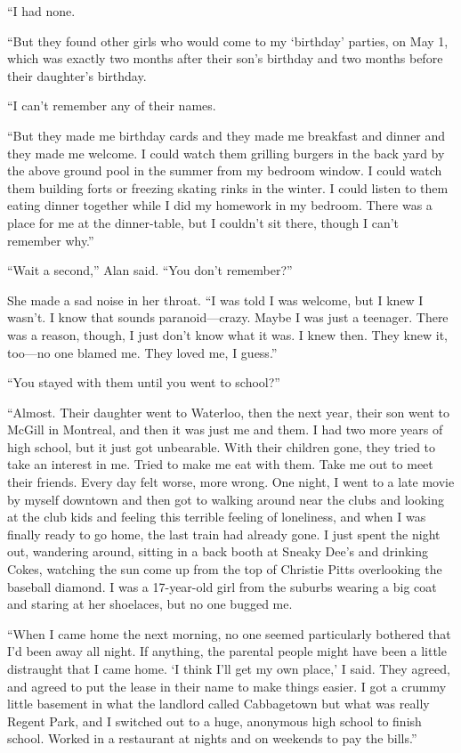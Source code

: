 \documentclass{article}
\begin{document}
``I had none.

``But they found other girls who would come to my `birthday' parties,
on May 1, which was exactly two months after their son's birthday and
two months before their daughter's birthday.

``I can't remember any of their names.

``But they made me birthday cards and they made me breakfast and
dinner and they made me welcome.  I could watch them grilling burgers
in the back yard by the above ground pool in the summer from my
bedroom window.  I could watch them building forts or freezing skating
rinks in the winter.  I could listen to them eating dinner together
while I did my homework in my bedroom.  There was a place for me at
the dinner-table, but I couldn't sit there, though I can't remember
why.''

``Wait a second,'' Alan said.  ``You don't remember?''

She made a sad noise in her throat.  ``I was told I was welcome, but I
knew I wasn't.  I know that sounds paranoid---crazy.  Maybe I was just
a teenager.  There was a reason, though, I just don't know what it
was.  I knew then.  They knew it, too---no one blamed me.  They loved
me, I guess.''

``You stayed with them until you went to school?''

``Almost.  Their daughter went to Waterloo, then the next year, their
son went to McGill in Montreal, and then it was just me and them.  I
had two more years of high school, but it just got unbearable.  With
their children gone, they tried to take an interest in me.  Tried to
make me eat with them.  Take me out to meet their friends.  Every day
felt worse, more wrong.  One night, I went to a late movie by myself
downtown and then got to walking around near the clubs and looking at
the club kids and feeling this terrible feeling of loneliness, and
when I was finally ready to go home, the last train had already gone. 
I just spent the night out, wandering around, sitting in a back booth
at Sneaky Dee's and drinking Cokes, watching the sun come up from the
top of Christie Pitts overlooking the baseball diamond.  I was a
17-year-old girl from the suburbs wearing a big coat and staring at
her shoelaces, but no one bugged me.

``When I came home the next morning, no one seemed particularly
bothered that I'd been away all night.  If anything, the parental
people might have been a little distraught that I came home.  `I think
I'll get my own place,' I said.  They agreed, and agreed to put the
lease in their name to make things easier.  I got a crummy little
basement in what the landlord called Cabbagetown but what was really
Regent Park, and I switched out to a huge, anonymous high school to
finish school.  Worked in a restaurant at nights and on weekends to
pay the bills.''
\end{document}
